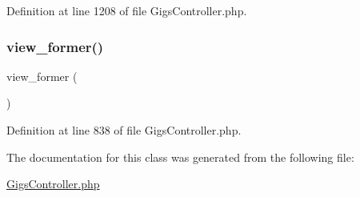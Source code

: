 Definition at line 1208 of file Gigs\+Controller.\+php.

\mbox{\label{class_responsive_1_1_http_1_1_controllers_1_1_gigs_controller_aac46d13297bfa2039955bbd50d414ec0}} 
\subsubsection{\texorpdfstring{view\_former()}{view\_former()}}
{\footnotesize\ttfamily view\+\_\+former (\begin{DoxyParamCaption}{ }\end{DoxyParamCaption})}



Definition at line 838 of file Gigs\+Controller.\+php.



The documentation for this class was generated from the following file\+:\begin{DoxyCompactItemize}
\item 
\mbox{\hyperlink{_gigs_controller_8php}{Gigs\+Controller.\+php}}\end{DoxyCompactItemize}
